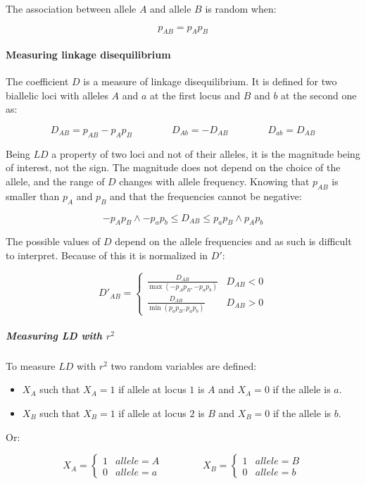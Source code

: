 		The association between allele $A$ and allele $B$ is random when:

		$$p_{AB} = p_Ap_B$$

			\paragraph{Measuring linkage disequilibrium}
			The coefficient $D$ is a measure of linkage disequilibrium.
			It is defined for two biallelic loci with alleles $A$ and $a$ at the first locus and $B$ and $b$ at the second one as:

			$$D_{AB} = p_{AB} - p_Ap_B\qquad\qquad D_{Ab} = -D_{AB}\qquad\qquad D_{ab} = D_{AB}$$

			Being $LD$ a property of two loci and not of their alleles, it is the magnitude being of interest, not the sign.
			The magnitude does not depend on the choice of the allele, and the range of $D$ changes with allele frequency.
			Knowing that $p_{AB}$ is smaller than $p_A$ and $p_B$ and that the frequencies cannot be negative:

			$$-p_Ap_B\land -p_ap_b\le D_{AB}\le p_ap_B\land p_Ap_b$$

			The possible values of $D$ depend on the allele frequencies and as such is difficult to interpret.
			Because of this it is normalized in $D'$:

			$$D'_{AB} = \begin{cases}\frac{D_{AB}}{\max(-p_Ap_B, -p_ap_b)} & D_{AB} < 0\\\frac{D_{AB}}{\min(p_ap_B, p_ap_b)} & D_{AB}>0\end{cases}$$

				\subparagraph{Measuring LD with $r^2$}
				To measure $LD$ with $r^2$ two random variables are defined:

				\begin{multicols}{2}
					\begin{itemize}
						\item $X_A$ such that $X_A=1$ if allele at locus $1$ is $A$ and $X_A=0$ if the allele is $a$.
						\item $X_B$ such that $X_B=1$ if allele at locus $2$ is $B$ and $X_B=0$ if the allele is $b$.
					\end{itemize}
				\end{multicols}

				Or:

				$$X_A = \begin{cases}1 & allele=A\\0 & allele = a\end{cases}\qquad\qquad X_B = \begin{cases}1 & allele = B\\0 & allele = b\end{cases}$$

